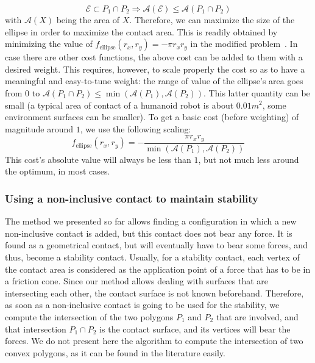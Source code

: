 \begin{equation}
\mathcal{E} \subset P_1 \cap P_2 \Longrightarrow  \mathcal{A}(\mathcal{E}) \le \mathcal{A}(P_1 \cap P_2)
\end{equation}
with $\mathcal{A}(X)$ being the area of $X$.\newline
Therefore, we can maximize the size of the ellipse in order to maximize the contact area.
This is readily obtained by minimizing the value of $f_{\text{ellipse}}(r_x, r_y) = -\pi r_x r_y$ in the modified problem~.
In case there are other cost functions, the above cost can be added to them with a desired weight.
This requires, however, to scale properly the cost so as to have a meaningful and easy-to-tune weight: the range of value of the ellipse's area goes from $0$ to $\mathcal{A}(P_1 \cap P_2) \leq \min (\mathcal{A}(P_1), \mathcal{A}(P_2))$.
This latter quantity can be small (a typical area of contact of a humanoid robot is about $0.01m^2$, some environment surfaces can be smaller).
To get a basic cost (before weighting) of magnitude around $1$, we use the following scaling:
\begin{equation}
f_\text{ellipse}(r_x, r_y) = - \frac{\pi r_x r_y}{\min (\mathcal{A}(P_1), \mathcal{A}(P_2))}
\label{eq:cost-ellipse}
\end{equation}
This cost's absolute value will always be less than $1$, but not much less around the optimum, in most cases.


\subsubsection{Using a non-inclusive contact to maintain stability}
\label{subsubsec:stability}


The method we presented so far allows finding a configuration in which a new non-inclusive contact is added, but this contact does not bear any force.
It is found as a geometrical contact, but will eventually have to bear some forces, and thus, become a stability contact.
Usually, for a stability contact, each vertex of the contact area is considered as the application point of a force that has to be in a friction cone.
Since our method allows dealing with surfaces that are intersecting each other, the contact surface is not known beforehand.
Therefore, as soon as a non-inclusive contact is going to be used for the stability, we compute the intersection of the two polygons $P_1$ and $P_2$ that are involved, and that intersection $P_1 \cap P_2$ is the contact surface, and its vertices will bear the forces.
We do not present here the algorithm to compute the intersection of two convex polygons, as it can be found in the literature easily.

